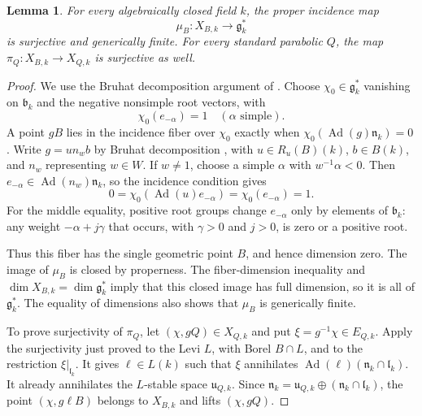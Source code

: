 \documentclass[twoside,a4paper,12pt,reqno]{amsart}
\newtheorem{lemma}[theorem]{Lemma}
\theoremstyle{remark}
\numberwithin{equation}{section}
\newcommand{\fg}{\mathfrak g}
\newcommand{\fn}{\mathfrak n}
\newcommand{\fl}{\mathfrak l}
\newcommand{\fu}{\mathfrak u}
\newcommand{\fB}{\mathfrak b}
\DeclareMathOperator{\Ad}{Ad}
\begin{document}
\begin{lemma}\label{lem:coadjoint-density}
For every algebraically closed field \(k\), the proper incidence map
\[
\mu_B:X_{B,k}\longrightarrow\fg_k^*
\]
is surjective and generically finite.
For every standard parabolic \(Q\), the map
\(\pi_Q:X_{B,k}\to X_{Q,k}\) is surjective as well.
\end{lemma}
\begin{proof}
We use the Bruhat decomposition argument of \cite[Lem.~2.5]{PT}.
Choose \(\chi_0\in\fg_k^*\)
vanishing on \(\fB_k\) and the negative nonsimple root vectors, with
\[
\chi_0(e_{-\alpha})=1
\quad(\alpha\text{ simple}).
\]
A point \(gB\) lies in the incidence fiber over \(\chi_0\) exactly
when \(\chi_0(\Ad(g)\fn_k)=0\).
Write \(g=u n_w b\) by Bruhat decomposition
\cite[Thm.~1.4.12]{Conrad}, with
\(u\in R_u(B)(k)\), \(b\in B(k)\), and \(n_w\) representing \(w\in W\).
If \(w\ne1\), choose a simple \(\alpha\) with \(w^{-1}\alpha<0\).
Then \(e_{-\alpha}\in\Ad(n_w)\fn_k\), so the incidence condition gives
\[
0=\chi_0(\Ad(u)e_{-\alpha})=\chi_0(e_{-\alpha})=1.
\]
For the middle equality, positive root groups change
\(e_{-\alpha}\) only by elements of \(\fB_k\): any weight
\(-\alpha+j\gamma\) that occurs, with \(\gamma>0\) and \(j>0\),
is zero or a positive root.

Thus this fiber has the single geometric point \(B\), and hence
dimension zero. The image of \(\mu_B\) is closed by properness.
The fiber-dimension inequality and
\(\dim X_{B,k}=\dim\fg_k^*\) imply that this closed image has full
dimension, so it is all of \(\fg_k^*\).
The equality of dimensions also shows that \(\mu_B\) is generically finite.

To prove surjectivity of \(\pi_Q\), let \((\chi,gQ)\in X_{Q,k}\)
and put \(\xi=g^{-1}\chi\in E_{Q,k}\).
Apply the surjectivity just proved to the Levi \(L\), with Borel
\(B\cap L\), and to the restriction \(\xi|_{\fl_k}\).
It gives \(\ell\in L(k)\) such that \(\xi\) annihilates
\(\Ad(\ell)(\fn_k\cap\fl_k)\).
It already annihilates the \(L\)-stable space \(\fu_{Q,k}\).
Since
\(\fn_k=\fu_{Q,k}\oplus(\fn_k\cap\fl_k)\),
the point \((\chi,g\ell B)\) belongs to \(X_{B,k}\) and lifts
\((\chi,gQ)\).
\end{proof}
\end{document}
